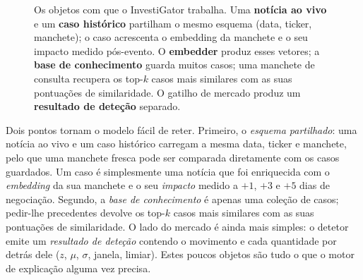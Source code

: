 \begin{figure}[ht]
\centering
{}
\caption[O modelo de dados do InvestiGator]{Os objetos com que o InvestiGator trabalha. Uma
\textbf{notícia ao vivo} e um \textbf{caso histórico} partilham o mesmo esquema (data, ticker, manchete);
o caso acrescenta o embedding da manchete e o seu impacto medido pós-evento. O \textbf{embedder}
produz esses vetores; a \textbf{base de conhecimento} guarda muitos casos; uma manchete de consulta recupera
os top-$k$ casos mais similares com as suas pontuações de similaridade. O gatilho de mercado produz um
\textbf{resultado de deteção} separado.}
\label{fig:datamodel}
\end{figure}

Dois pontos tornam o modelo fácil de reter. Primeiro, o \emph{esquema partilhado}: uma notícia ao vivo e
um caso histórico carregam a mesma data, ticker e manchete, pelo que uma manchete fresca pode ser
comparada diretamente com os casos guardados. Um caso é simplesmente uma notícia que foi enriquecida com
o \emph{embedding} da sua manchete e o seu \emph{impacto} medido a $+1$, $+3$ e $+5$
dias de negociação. Segundo, a \emph{base de conhecimento} é apenas uma coleção de casos; pedir-lhe
precedentes devolve os top-$k$ casos mais similares com as suas pontuações de similaridade. O lado do
mercado é ainda mais simples: o detetor emite um \emph{resultado de deteção} contendo o movimento e cada
quantidade por detrás dele ($z$, $\mu$, $\sigma$, janela, limiar). Estes poucos objetos são tudo o que o
motor de explicação alguma vez precisa.

